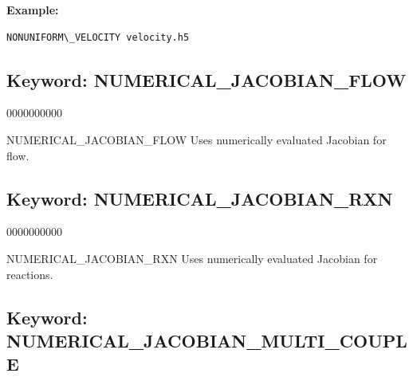 \begin{mdframed}
{\bf Example: }
\footnotesize

\begin{Verbatim}
NONUNIFORM\_VELOCITY velocity.h5
\end{Verbatim}
\normalsize
\end{mdframed}

\hyperlink{target_key}{\return}


\newpage
\protect\hypertarget{target_numjac_flow}{}

\subsection{Keyword: NUMERICAL\_JACOBIAN\_FLOW}

\hfill\hyperlink{target_key}{\return}

\begin{deflist}{0000000000}
\item[NUMERICAL\_JACOBIAN\_FLOW] 
Uses numerically evaluated Jacobian for flow.
\end{deflist}

\hyperlink{target_key}{\return}



\newpage
\protect\hypertarget{target_numjac_rxn}{}

\subsection{Keyword: NUMERICAL\_JACOBIAN\_RXN}

\hfill\hyperlink{target_key}{\return}

\begin{deflist}{0000000000}
\item[NUMERICAL\_JACOBIAN\_RXN]
Uses numerically evaluated Jacobian for reactions.
\end{deflist}

\hyperlink{target_key}{\return}



\newpage
\protect\hypertarget{target_numjac_multi}{}

\subsection{Keyword: NUMERICAL\_JACOBIAN\_MULTI\_COUPLE}

